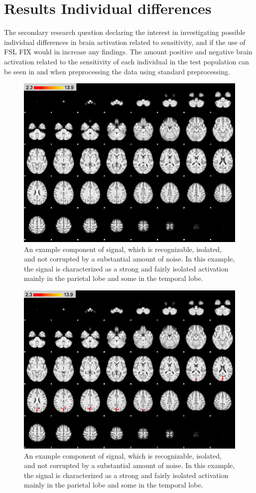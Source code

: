 \section{Results Individual differences}

The secondary research question declaring the interest in investigating possible individual differences in brain activation related to sensitivity, and if the use of FSL FIX would in increase any findings. The amount positive and negative brain activation related to the sensitivity of each individual in the test population can be seen in  and  when preprocessing the data using standard preprocessing. 

\begin{figure}[H]                 
	\includegraphics[width=.65\textwidth]{figures/Results/STD_pos_ID}  
	\caption{An example component of signal, which is recognizable, isolated, and not corrupted by a substantial amount of noise. In this example, the signal is characterized as a strong and fairly isolated activation mainly in the parietal lobe and some in the temporal lobe.}
	\label{STD_pos_ID} 
\end{figure}

\begin{figure}[H]                 
	\includegraphics[width=.65\textwidth]{figures/Results/STD_neg_ID}  
	\caption{An example component of signal, which is recognizable, isolated, and not corrupted by a substantial amount of noise. In this example, the signal is characterized as a strong and fairly isolated activation mainly in the parietal lobe and some in the temporal lobe.}
	\label{STD_neg_ID} 
\end{figure}

